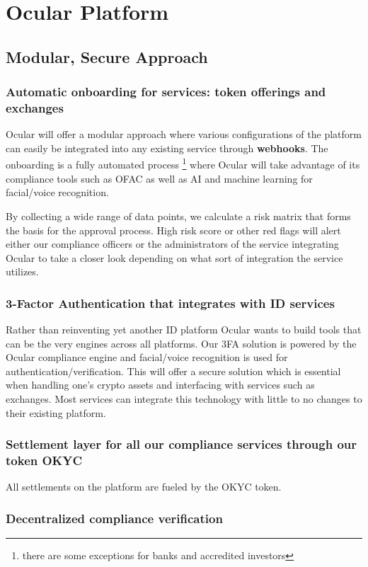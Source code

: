 \documentclass[a4paper]{article}
\begin{document}
\section{Ocular Platform}
\subsection{Modular, Secure Approach}
\subsubsection*{Automatic onboarding for services: token offerings and exchanges}
Ocular will offer a modular approach where various configurations of the platform can easily be integrated into any existing service through \textbf{webhooks}. The onboarding is a fully automated process \footnote{there are some exceptions for banks and accredited investors} where Ocular will take advantage of its compliance tools such as OFAC as well as AI and machine learning for facial/voice recognition. 

By collecting a wide range of data points, we calculate a risk matrix that forms the basis for the approval process. High risk score or other red flags will alert either our compliance officers or the administrators of the service integrating Ocular to take a closer look depending on what sort of integration the service utilizes.

\subsubsection*{3-Factor Authentication that integrates with ID services}
Rather than reinventing yet another ID platform Ocular wants to build tools that can be the very engines across all platforms. Our 3FA solution is powered by the Ocular compliance engine and facial/voice recognition is used for authentication/verification. This will offer a secure solution which is essential when handling one's crypto assets and interfacing with services such as exchanges. Most services can integrate this technology with little to no changes to their existing platform. 


\subsubsection*{Settlement layer for all our compliance services through our token OKYC}
All settlements on the platform are fueled by the OKYC token. 

\subsubsection*{Decentralized compliance verification}
\end{document}
